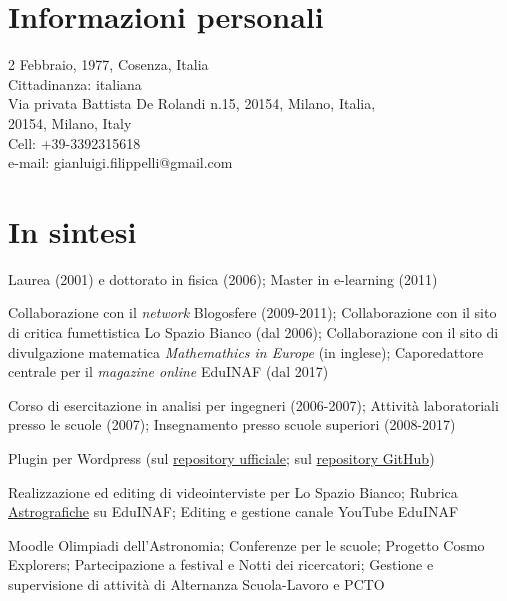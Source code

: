 \section{Informazioni personali}

\begin{flushleft}
	2 Febbraio, 1977, Cosenza, Italia\\
	Cittadinanza: italiana\\
	Via privata Battista De Rolandi n.15, 20154, Milano, Italia,\\
	20154, Milano, Italy\\ 
	Cell: +39-3392315618\\
	e-mail: gianluigi.filippelli@gmail.com\\
\end{flushleft}

\section{In sintesi}

\begin{CV}
	
	\item[Titolo di studio:] Laurea (2001) e dottorato in fisica (2006); Master in e-learning (2011)
	\item[Esperienze editoriali:] Collaborazione con il \emph{network} Blogosfere (2009-2011); Collaborazione con il sito di critica fumettistica Lo Spazio Bianco (dal 2006); Collaborazione con il sito di divulgazione matematica \emph{Mathemathics in Europe} (in inglese); Caporedattore centrale per il\emph{ magazine online} EduINAF (dal 2017)
	\item[Esperienze didattiche:] Corso di esercitazione in analisi per ingegneri (2006-2007); Attivit\`a laboratoriali presso le scuole (2007); Insegnamento presso scuole superiori (2008-2017)
	\item[Programmazione:] Plugin per Wordpress (sul \href{https://profiles.wordpress.org/ulaulaman/}{repository ufficiale}; sul \href{https://github.com/ulaulaman}{repository GitHub})
	\item[Grafica e video:] Realizzazione ed editing di videointerviste per Lo Spazio Bianco; Rubrica \href{https://edu.inaf.it/category/rubriche/astrografiche/}{Astrografiche} su EduINAF; Editing e gestione canale YouTube EduINAF
	\item[Attivit\`a INAF:] Moodle Olimpiadi dell'Astronomia; Conferenze per le scuole; Progetto Cosmo Explorers; Partecipazione a festival e Notti dei ricercatori; Gestione e supervisione di attivit\`a di Alternanza Scuola-Lavoro e PCTO
\end{CV}

